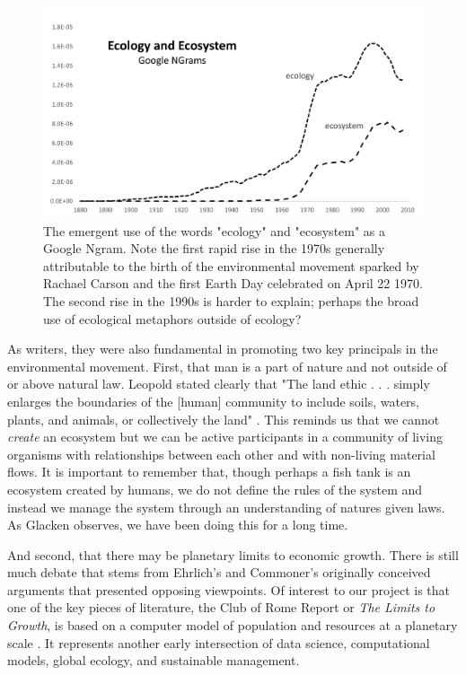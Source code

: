  \begin{figure}[!ht]
  \centering
    \includegraphics[width=5.5in]{figures/ecologyEcosystem}
  \caption{The emergent use of the words "ecology" and "ecosystem" as a Google Ngram. Note the first rapid rise in the 1970s generally attributable to the birth of the environmental movement sparked by Rachael Carson and the first Earth Day celebrated on April 22 1970. The second rise in the 1990s is harder to explain; perhaps the broad use of ecological metaphors outside of ecology?}
\end{figure}
 
 As writers, they were also fundamental in promoting two key principals in the environmental movement. First, that man is a part of nature and not outside of or above natural law. Leopold stated clearly that "The land ethic . . . simply enlarges the boundaries of the [human] community to include soils, waters, plants, and animals, or collectively the land" \citep[][p. 204]{leopold_1949}. This reminds us that we cannot \textit{create} an ecosystem but we can be active participants in a community of living organisms with relationships between each other and  with non-living material flows. It is important to remember that, though perhaps a fish tank is an ecosystem created by humans, we do not define the rules of the system and instead we manage the system through an understanding of natures given laws. As Glacken observes, we have been doing this for a long time.

 And second, that there may be planetary limits to economic growth. There is still much debate that stems from Ehrlich's and Commoner's originally conceived arguments that presented opposing viewpoints. Of interest to our project is that one of the key pieces of literature, the Club of Rome Report or \textit{The Limits to Growth}, is based on a computer model of population and resources at a planetary scale \citep{meadows_1972}. It represents another early intersection of data science, computational models, global ecology, and sustainable management.
 
